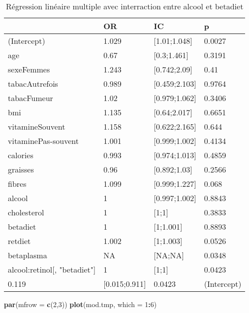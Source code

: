 \documentclass[]{article}
\newenvironment{Shaded}{\begin{snugshade}}{\end{snugshade}}
\newcommand{\KeywordTok}[1]{\textcolor[rgb]{0.13,0.29,0.53}{\textbf{#1}}}
\newcommand{\DataTypeTok}[1]{\textcolor[rgb]{0.13,0.29,0.53}{#1}}
\newcommand{\DecValTok}[1]{\textcolor[rgb]{0.00,0.00,0.81}{#1}}
\newcommand{\OperatorTok}[1]{\textcolor[rgb]{0.81,0.36,0.00}{\textbf{#1}}}
\newcommand{\NormalTok}[1]{#1}
\begin{document}
\begin{table}

\caption{\label{tab:unnamed-chunk-91}Régression linéaire multiple avec interraction entre alcool et betadiet}
\centering
\begin{tabular}[t]{l|l|l|l}
\hline
  & OR & IC & p\\
\hline
\rowcolor[HTML]{BBD2E1}  (Intercept) & 1.029 & [1.01;1.048] & 0.0027\\
\hline
age & 0.67 & [0.3;1.461] & 0.3191\\
\hline
\rowcolor[HTML]{BBD2E1}  sexeFemmes & 1.243 & [0.742;2.09] & 0.41\\
\hline
tabacAutrefois & 0.989 & [0.459;2.103] & 0.9764\\
\hline
\rowcolor[HTML]{BBD2E1}  tabacFumeur & 1.02 & [0.979;1.062] & 0.3406\\
\hline
bmi & 1.135 & [0.64;2.017] & 0.6651\\
\hline
\rowcolor[HTML]{BBD2E1}  vitamineSouvent & 1.158 & [0.622;2.165] & 0.644\\
\hline
vitaminePas-souvent & 1.001 & [0.999;1.002] & 0.4134\\
\hline
\rowcolor[HTML]{BBD2E1}  calories & 0.993 & [0.974;1.013] & 0.4859\\
\hline
graisses & 0.96 & [0.892;1.03] & 0.2566\\
\hline
\rowcolor[HTML]{BBD2E1}  fibres & 1.099 & [0.999;1.227] & 0.068\\
\hline
alcool & 1 & [0.997;1.002] & 0.8843\\
\hline
\rowcolor[HTML]{BBD2E1}  cholesterol & 1 & [1;1] & 0.3833\\
\hline
betadiet & 1 & [1;1.001] & 0.8893\\
\hline
\rowcolor[HTML]{BBD2E1}  retdiet & 1.002 & [1;1.003] & 0.0526\\
\hline
betaplasma & NA & [NA;NA] & 0.0348\\
\hline
\rowcolor[HTML]{BBD2E1}  alcool:retinol[, "betadiet"] & 1 & [1;1] & 0.0423\\
\hline
0.119 & [0.015;0.911] & 0.0423 & (Intercept)\\
\hline
\end{tabular}
\end{table}

\begin{Shaded}
\begin{Highlighting}[]
\KeywordTok{par}\NormalTok{(}\DataTypeTok{mfrow =} \KeywordTok{c}\NormalTok{(}\DecValTok{2}\NormalTok{,}\DecValTok{3}\NormalTok{))}
\KeywordTok{plot}\NormalTok{(mod.tmp, }\DataTypeTok{which =} \DecValTok{1}\OperatorTok{:}\DecValTok{6}\NormalTok{)}
\end{Highlighting}
\end{Shaded}
\end{document}
